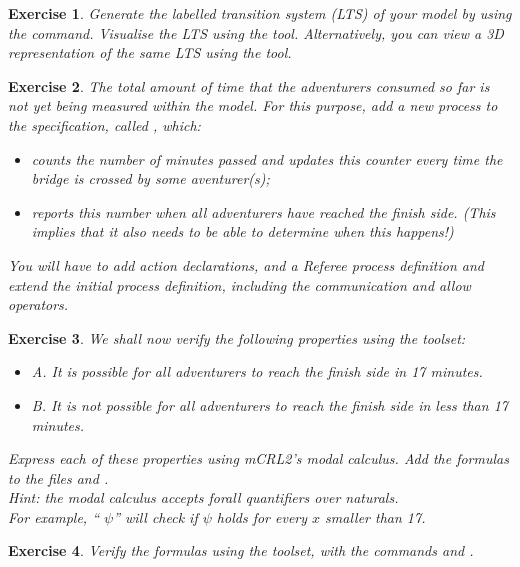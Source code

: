 \documentclass[11pt]{article}
\theoremstyle{myplain}
\newtheorem{exercise}{Exercise}
\theoremstyle{definition} %
\begin{document}
\begin{exercise}
  Generate the labelled transition system (LTS) of your model by using the  command.
Visualise the LTS using the  tool.
Alternatively, you can view a 3D representation of the same LTS using the  tool.
\end{exercise}


\begin{exercise}
The total amount of time that the adventurers consumed so far is not yet being measured within the model. For this purpose, add a new process to the specification, called , which:
\begin{itemize}
  \item counts the number of minutes passed and updates this counter every time the bridge is crossed by some aventurer(s);
  \item reports this number when all adventurers have reached the \emph{finish side}. (This implies that it also needs to be able to determine when this happens!)
\end{itemize}
You will have to add action declarations, and a \emph{Referee} process definition and extend the initial process definition, including the communication and allow operators.
\end{exercise}


\begin{exercise}
We shall now verify the following properties using the toolset:
\begin{itemize}
  \item A. It is possible for all adventurers to reach the finish side in 17 minutes.
  \item B. It is not possible for all adventurers to reach the finish side in less than 17 minutes.
\end{itemize}

Express each of these properties using mCRL2's modal calculus. Add the formulas to the files  and .
\\[2mm]
\emph{Hint: the modal calculus accepts forall quantifiers over naturals.}
\\\emph{For example, `` $\psi$'' will check if $\psi$ holds for every $x$ smaller than 17.}
\end{exercise}


\begin{exercise}
Verify the formulas using the toolset, with the commands  and .
\end{exercise}
\end{document}
